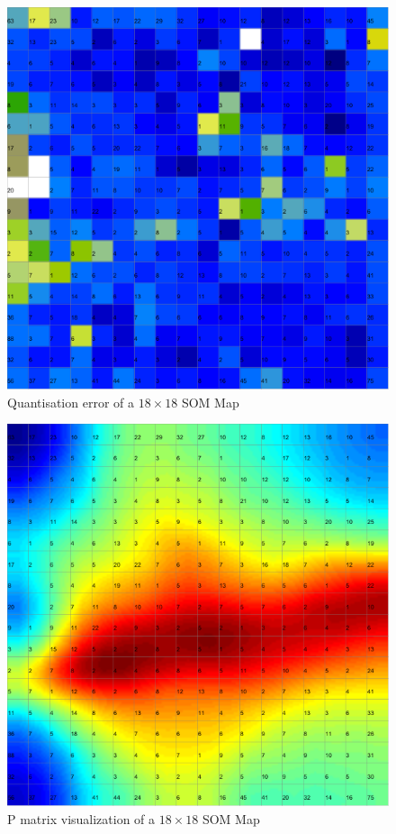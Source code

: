 \documentclass{acm_proc_article-sp}
\begin{document}
\begin{figure}
\centering
\includegraphics[width=\linewidth]{img/wine-mid-mean-quant-error}
\caption{Quantisation error of a $18\times18$ SOM Map}
\label{fig:wine-mid-mean-quant-error}
\end{figure}

\begin{figure}
\centering
\includegraphics[width=\linewidth]{img/wine-mid-p-matrix}
\caption{P matrix visualization of a $18\times18$ SOM Map}
\label{fig:wine-mid-p-matrix}
\end{figure}
\end{document}
